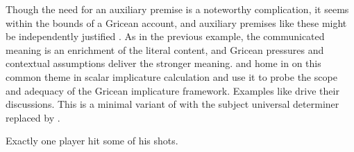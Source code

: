 \documentclass[leqno,12pt]{article}
\begin{document}
Though the need for an auxiliary premise is a noteworthy complication,
it seems within the bounds of a Gricean account, and auxiliary
premises like these might be independently justified
\citep{Russell06}. As in the previous example, the communicated
meaning is an enrichment of the literal content, and Gricean pressures
and contextual assumptions deliver the stronger
meaning. \citet{Geurts:Pouscoulous:2009} and
\citet{Chemla:Spector:2011} home in on this common theme in scalar
implicature calculation and use it to probe the scope and adequacy of
the Gricean implicature framework. Examples like 
drive their discussions.  This is a minimal variant of 
with the subject universal determiner  replaced by
.
%
\begin{examples}
\item\label{exactlyonesome} Exactly one player hit some of his shots.
\end{examples}
\end{document}
